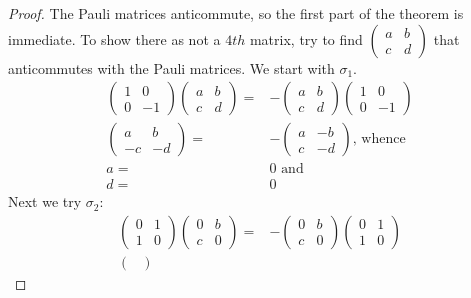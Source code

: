 \documentclass[]{article}
\begin{document}
\begin{proof}
	The Pauli matrices anticommute, so the first part of the theorem is immediate. To show there as not a $4th$ matrix, try to find $\begin{pmatrix}
		a & b\\
		c & d
	\end{pmatrix}$ that anticommutes with the Pauli matrices. We start with $\sigma_1$.
	\begin{align*}
		\begin{pmatrix}
			1 & 0\\
			0 & -1
		\end{pmatrix}	\begin{pmatrix}
		a & b\\
		c & d
		\end{pmatrix} =& -	\begin{pmatrix}
		a & b\\
		c & d
		\end{pmatrix}	\begin{pmatrix}
		1 & 0\\
		0 & -1
		\end{pmatrix}\\
		\begin{pmatrix}
			a & b\\
			-c & -d
		\end{pmatrix} =& - \begin{pmatrix}
			a & -b\\
			c & -d
		\end{pmatrix} \text{, whence}\\
		a=&0 \text{ and} \\
		d=&0
	\end{align*}
	Next we try $\sigma_2$:
	\begin{align*}
		\begin{pmatrix}
			0 & 1\\
			1 & 0
		\end{pmatrix} \begin{pmatrix}
			0 & b\\
			c & 0
		\end{pmatrix} =& -\begin{pmatrix}
			0 & b\\
			c & 0
		\end{pmatrix} \begin{pmatrix}
			0 & 1\\
			1 & 0
		\end{pmatrix}\\
		\begin{pmatrix}

\end{pmatrix}
\end{align*}
\end{proof}
\end{document}
